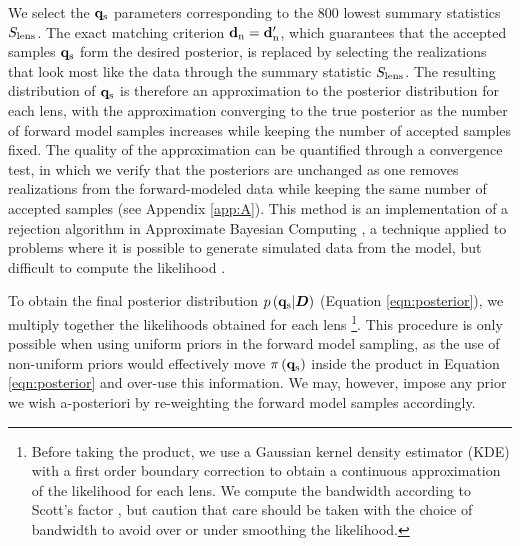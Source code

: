 We select the ${\bf{q}_{\rm{s}}}$ parameters corresponding to the $800$ lowest summary statistics $S_{\rm{lens}}$. The exact matching criterion ${\bf{d}_{\rm{n}}} = {\bf{d}_{\rm{n}}^{\prime}}$, which guarantees that the accepted samples ${\bf{q}_{\rm{s}}}$ form the desired posterior, is replaced by selecting the realizations that look most like the data through the summary statistic $S_{\rm{lens}}$. The resulting distribution of ${\bf{q}_{\rm{s}}}$ is therefore an approximation to the posterior distribution for each lens, with the approximation converging to the true posterior as the number of forward model samples increases while keeping the number of accepted samples fixed. The quality of the approximation can be quantified through a convergence test, in which we verify that the posteriors are unchanged as one removes realizations from the forward-modeled data while keeping the same number of accepted samples (see Appendix \ref{app:A}). This method is an implementation of a rejection algorithm in Approximate Bayesian Computing \citep{Rubin1984,Marin++11,Lintusaari++17}, a technique applied to problems where it is possible to generate simulated data from the model, but difficult to compute the likelihood \citep[see also][]{Beaumont++02,Akeret++15,Birrer++17a,Hahn++17}.

To obtain the final posterior distribution $p \left({\bf{q}_{\rm{s}}} | \boldsymbol{D}\right)$ (Equation \ref{eqn:posterior}), we multiply together the likelihoods obtained for each lens \footnote{Before taking the product, we use a Gaussian kernel density estimator (KDE) with a first order boundary correction \citep[e.g.][]{Lewis15} to obtain a continuous approximation of the likelihood for each lens. We compute the bandwidth according to Scott's factor \citep{Scott92}, but caution that care should be taken with the choice of bandwidth to avoid over or under smoothing the likelihood.}. This procedure is only possible when using uniform priors in the forward model sampling, as the use of non-uniform priors would effectively move $\pi \left({\bf{q}_{\rm{s}}}\right)$ inside the product in Equation \ref{eqn:posterior} and over-use this information. We may, however, impose any prior we wish a-posteriori by re-weighting the forward model samples accordingly. 

